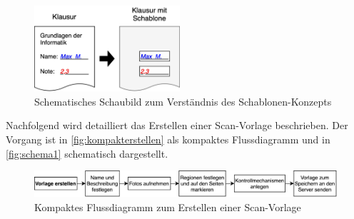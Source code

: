 \documentclass[notables, nomenclature, oneside, 150]{HSMW-Thesis}
\begin{document}
		\begin{figure}[h!]
    		\centering
    		\includegraphics[width=0.48\textwidth]{img/schablone1}
    		\caption{Schematisches Schaubild zum Verständnis des Schablonen-Konzepts}
    		\label{fig:schablone1}
    	\end{figure}
		
		Nachfolgend wird detailliert das Erstellen einer Scan-Vorlage beschrieben. Der Vorgang ist in \autoref{fig:kompakterstellen} als kompaktes Flussdiagramm und in \autoref{fig:schema1} schematisch dargestellt.
		
		 \begin{figure}[th]
    		\centering
    		\includegraphics[width=\textwidth]{img/erstellen_flow_small}
    		\caption{Kompaktes Flussdiagramm zum Erstellen einer Scan-Vorlage}
    		\label{fig:kompakterstellen}
    	\end{figure}
	
\end{document}
